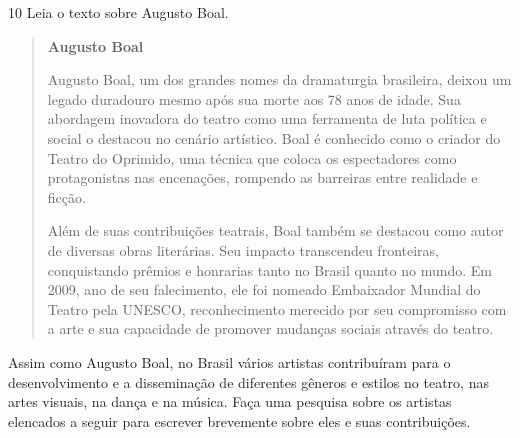 

\num{10} Leia o texto sobre Augusto Boal.

\begin{quote}
\textbf{Augusto Boal}

Augusto Boal, um dos grandes nomes da dramaturgia brasileira, deixou um legado duradouro mesmo após sua morte aos 78 anos de idade. Sua abordagem inovadora do teatro como uma ferramenta de luta política e social o destacou no cenário artístico. Boal é conhecido como o criador do Teatro do Oprimido, uma técnica que coloca os espectadores como protagonistas nas encenações, rompendo as barreiras entre realidade e ficção.

Além de suas contribuições teatrais, Boal também se destacou como autor de diversas obras literárias. Seu impacto transcendeu fronteiras, conquistando prêmios e honrarias tanto no Brasil quanto no mundo. Em 2009, ano de seu falecimento, ele foi nomeado Embaixador Mundial do Teatro pela UNESCO, reconhecimento merecido por seu compromisso com a arte e sua capacidade de promover mudanças sociais através do teatro.

\end{quote}

Assim como Augusto Boal, no Brasil vários artistas contribuíram para o
desenvolvimento e a disseminação de diferentes gêneros e estilos no
teatro, nas artes visuais, na dança e na música. Faça uma pesquisa sobre os artistas elencados a seguir para escrever brevemente sobre eles e suas contribuições.

